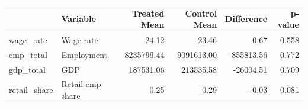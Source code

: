 \begin{tabular}[t]{llrrrr}
\toprule
  & Variable & Treated Mean & Control Mean & Difference & p-value\\
\midrule
wage\_rate & Wage rate & 24.12 & 23.46 & 0.67 & 0.558\\
emp\_total & Employment & 8235799.44 & 9091613.00 & -855813.56 & 0.772\\
gdp\_total & GDP & 187531.06 & 213535.58 & -26004.51 & 0.709\\
retail\_share & Retail emp. share & 0.25 & 0.29 & -0.03 & 0.081\\
\bottomrule
\end{tabular}
